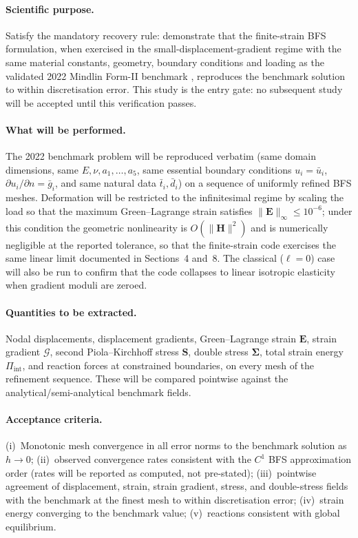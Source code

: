 \documentclass[11pt]{article}
\begin{document}
\paragraph{Scientific purpose.}
Satisfy the mandatory recovery rule: demonstrate that the finite-strain
BFS formulation, when exercised in the small-displacement-gradient
regime with the same material constants, geometry, boundary
conditions and loading as the validated 2022 Mindlin Form-II
benchmark \cite{TorabiNiiranen2022}, reproduces the benchmark
solution to within discretisation error.  This study is the
entry gate: no subsequent study will be accepted until this
verification passes.

\paragraph{What will be performed.}
The 2022 benchmark problem will be reproduced verbatim (same
domain dimensions, same $E,\nu,a_{1},\ldots,a_{5}$, same essential
boundary conditions $u_i=\bar{u}_i$, $\partial u_i/\partial n=\bar{g}_i$,
and same natural data $\bar{t}_i,\bar{d}_i$) on a sequence of
uniformly refined BFS meshes.  Deformation will be restricted to
the infinitesimal regime by scaling the load so that the maximum
Green--Lagrange strain satisfies $\|\mathbf{E}\|_{\infty}\le 10^{-6}$;
under this condition the geometric nonlinearity is $O(\|\mathbf{H}\|^{2})$
and is numerically negligible at the reported tolerance, so that the
finite-strain code exercises the same linear limit documented in
Sections~4 and~8.  The classical ($\ell=0$) case will also be run
to confirm that the code collapses to linear isotropic elasticity
when gradient moduli are zeroed.

\paragraph{Quantities to be extracted.}
Nodal displacements, displacement gradients, Green--Lagrange strain
$\mathbf{E}$, strain gradient $\bm{\mathcal{G}}$, second
Piola--Kirchhoff stress $\mathbf{S}$, double stress
$\boldsymbol{\Sigma}$, total strain energy $\Pi_{\mathrm{int}}$,
and reaction forces at constrained boundaries, on every mesh of
the refinement sequence.  These will be compared pointwise against
the analytical/semi-analytical benchmark fields.

\paragraph{Acceptance criteria.}
(i)~Monotonic mesh convergence in all error norms to the benchmark
solution as $h\to0$; (ii)~observed convergence rates consistent with
the $C^1$ BFS approximation order (rates will be reported as
computed, not pre-stated); (iii)~pointwise agreement of displacement,
strain, strain gradient, stress, and double-stress fields with the
benchmark at the finest mesh to within discretisation error;
(iv)~strain energy converging to the benchmark value;
(v)~reactions consistent with global equilibrium.
\end{document}
